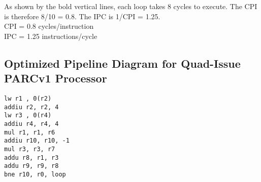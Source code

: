 \documentclass[10pt]{article}
\begin{document}
As shown by the bold vertical lines, each loop takes 8 cycles to execute. The CPI is therefore 8/10 = 0.8. The IPC is 1/CPI = 1.25.\\
CPI = 0.8 cycles/instruction\\
IPC = 1.25 instructions/cycle\\

\subsection{Optimized Pipeline Diagram for Quad-Issue PARCv1 Processor}

\begin{lstlisting}
lw r1 , 0(r2)     
addiu r2, r2, 4   
lw r3 , 0(r4)     
addiu r4, r4, 4   
mul r1, r1, r6    
addiu r10, r10, -1
mul r3, r3, r7    
addu r8, r1, r3   
addu r9, r9, r8   
bne r10, r0, loop                
\end{lstlisting}
\end{document}
